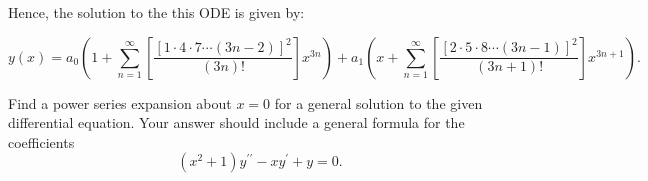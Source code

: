 \documentclass[11pt]{article}
\begin{document}
\begin{solution}
Hence, the solution to the this ODE is given by:

\begin{equation*}
\boxed{y(x) = a_{0} \left(1 + \sum_{n=1}^{\infty} \left[ \dfrac{\left[1 \cdot 4 \cdot 7 \cdots (3n-2) \right]^2}{(3n)!} \right] x^{3n} \right) + a_{1} \left(x+ \sum_{n=1}^{\infty} \left[\dfrac{\left[2 \cdot 5 \cdot 8 \cdots (3n-1) \right]^2}{(3n+1)!} \right] x^{3n+1} \right).}
\end{equation*}
\end{solution}




\begin{problem}
{ Find a power series expansion about $x =0$ for a general solution to the given differential equation. Your answer should include a general formula for the coefficients}
\begin{equation*}
(x^2+1)y^{\prime \prime} - x y^{\prime} + y =0.
\end{equation*}
\end{problem}
\end{document}
